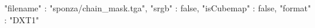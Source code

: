 { 
	"filename" : "sponza/chain_mask.tga", 
	"srgb" : false,
	"isCubemap" : false,
	"format" : "DXT1"
}